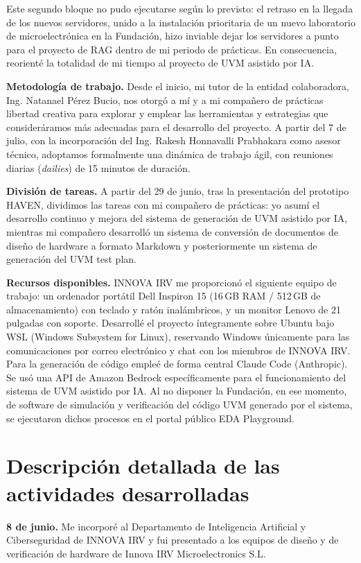 Este segundo bloque no pudo ejecutarse según lo previsto: el retraso en la llegada de los nuevos servidores, unido a la instalación prioritaria de un nuevo laboratorio de microelectrónica en la Fundación, hizo inviable dejar los servidores a punto para el proyecto de RAG dentro de mi periodo de prácticas. En consecuencia, reorienté la totalidad de mi tiempo al proyecto de UVM asistido por IA.

\textbf{Metodología de trabajo.} Desde el inicio, mi tutor de la entidad colaboradora, Ing. Natanael Pérez Bucio, nos otorgó a mí y a mi compañero de prácticas libertad creativa para explorar y emplear las herramientas y estrategias que consideráramos más adecuadas para el desarrollo del proyecto. A partir del 7 de julio, con la incorporación del Ing. Rakesh Honnavalli Prabhakara como asesor técnico, adoptamos formalmente una dinámica de trabajo ágil, con reuniones diarias (\emph{dailies}) de 15 minutos de duración.

\textbf{División de tareas.} A partir del 29 de junio, tras la presentación del prototipo HAVEN, dividimos las tareas con mi compañero de prácticas: yo asumí el desarrollo continuo y mejora del sistema de generación de UVM asistido por IA, mientras mi compañero desarrolló un sistema de conversión de documentos de diseño de hardware a formato Markdown y posteriormente un sistema de generación del UVM test plan.

\textbf{Recursos disponibles.} INNOVA IRV me proporcionó el siguiente equipo de trabajo: un ordenador portátil Dell Inspiron 15 (16\,GB RAM / 512\,GB de almacenamiento) con teclado y ratón inalámbricos, y un monitor Lenovo de 21 pulgadas con soporte. Desarrollé el proyecto íntegramente sobre Ubuntu bajo WSL (Windows Subsystem for Linux), reservando Windows únicamente para las comunicaciones por correo electrónico y chat con los miembros de INNOVA IRV. Para la generación de código empleé de forma central Claude Code (Anthropic). Se usó una API de Amazon Bedrock específicamente para el funcionamiento del sistema de UVM asistido por IA. Al no disponer la Fundación, en ese momento, de software de simulación y verificación del código UVM generado por el sistema, se ejecutaron dichos procesos en el portal público EDA Playground.

\section{Descripción detallada de las actividades desarrolladas}

\textbf{8 de junio.} Me incorporé al Departamento de Inteligencia Artificial y Ciberseguridad de INNOVA IRV y fui presentado a los equipos de diseño y de verificación de hardware de Innova IRV Microelectronics S.L.

